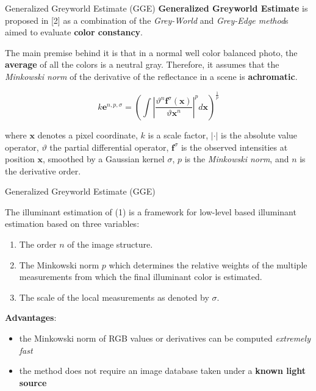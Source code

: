 \begin{tframe}{Generalized Greyworld Estimate (GGE)}
\textbf{Generalized Greyworld Estimate} is proposed in [2] as a combination of the \emph{Grey-World} and \emph{Grey-Edge method}s aimed to evaluate \textbf{color constancy}.

\vspace{0.3cm}
The main premise behind it is that in a normal well color balanced photo, the \textbf{average} of all the colors is a neutral gray. Therefore, it assumes that the \emph{Minkowski norm} of the derivative of the reflectance in a scene is \textbf{achromatic}.

\begin{equation}
k\textbf{e}^{n, p, \sigma} = (\int |\frac{\vartheta^{n}\textbf{f}^{\sigma}(\textbf{x})}{\vartheta\textbf{x}^{n}}|^{p}  d\textbf{x})^{\frac{1}{p}}
\end{equation}
\begin{footnotesize}
where $\textbf{x}$ denotes a pixel coordinate, $k$ is a scale factor, $|\cdot|$ is the absolute value operator, $\vartheta$ the partial differential operator, $\textbf{f}^{\sigma}$ is the observed intensities at position $\textbf{x}$, smoothed by a Gaussian kernel $\sigma$, $p$ is the \emph{Minkowski norm}, and $n$ is the derivative order.
\end{footnotesize}
\end{tframe}

\begin{tframe}{Generalized Greyworld Estimate (GGE)}

The illuminant estimation of (1) is a framework for low-level based illuminant estimation based on three variables:
\begin{enumerate}
\item The order $n$ of the image structure.
\item The Minkowski norm $p$ which determines the relative weights of the multiple measurements from which the final illuminant color is estimated.
\item The scale of the local measurements as denoted by $\sigma$.
\end{enumerate}
\vspace{0.2cm}
\textbf{Advantages}:
\begin{itemize}
\item the Minkowski norm of RGB values or derivatives can be computed\emph{ extremely fast}
\item the method does not require an image database taken under a \textbf{known light source}
\end{itemize}

\end{tframe}


